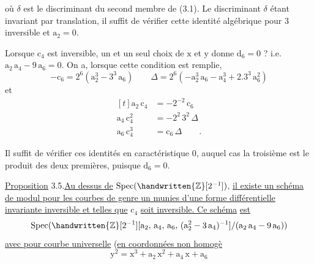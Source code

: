 où $\delta$ est le discriminant du second membre de (3.1). Le discriminant $\delta$ étant invariant par translation, il suffit de vérifier cette identité algébrique pour $3$ inversible et $\mathrm{a}_{2}=0$.

Lorsque $\mathrm{c}_{4}$ est inversible, un et un seul choix de $\mathrm{x}$ et $\mathrm{y}$ donne $\mathrm{d}_{6}=0$ ? i.e. $\mathrm{a}_{2}\,\mathrm{a}_{4}-9\,\mathrm{a}_{6}=0$. On a, lorsque cette condition est remplie,
\[
-\mathrm{c}_{6}=2^{6}(\mathrm{a}_{2}^{3}-3^{3}\,\mathrm{a}_{6})\qquad
\Delta=2^{6}(-\mathrm{a}_{2}^{3}\,\mathrm{a}_{6}-\mathrm{a}_{4}^{3}+2.3^{3}\,\mathrm{a}_{6}^{2})
\tag*{(3.3)}
\]
et
\[
\begin{aligned}[t]
\mathrm{a}_{2}\,\mathrm{c}_{4}&=-2^{-2}\,\mathrm{c}_{6}\\
\mathrm{a}_{4}\,\mathrm{c}_{4}^{2}&=-2^{2}\,3^{2}\,\Delta\\
\mathrm{a}_{6}\,\mathrm{c}_{4}^{3}&=\mathrm{c}_{6}\,\Delta\qquad.
\end{aligned}
\tag*{(3.4)}
\]

Il suffit de vérifier ces identités en caractéristique $0$, auquel cas la troisième est le produit des deux premières, puisque $\mathrm{d}_{6}=0$.

\uline{Proposition} 3.5.\quad \uline{Au dessus de} $\operatorname{Spec}(\handwritten{\mathbb{Z}}[2^{-1}])$, \uline{il existe un schéma de modul}\uline{ pour les courbes de genre un munies d'une forme différentielle invariante inversible et telles que} $\mathrm{c}_{4}$ \uline{soit inversible. Ce schéma} \reversemarginpar{}\normalmarginpar\uline{est}
\[
\operatorname{Spec}(\handwritten{\mathbb{Z}}[2^{-1}][\mathrm{a}_{2},\,\mathrm{a}_{4},\,\mathrm{a}_{6},\,(\mathrm{a}_{2}^{2}-3\,\mathrm{a}_{4})^{-1}]/(\mathrm{a}_{2}\,\mathrm{a}_{4}-9\,\mathrm{a}_{6}))
\]
\uline{avec pour courbe universelle} (\uline{en coordonnées non homogè}
\[
\mathrm{y}^{2}=\mathrm{x}^{3}+\mathrm{a}_{2}\,\mathrm{x}^{2}+\mathrm{a}_{4}\,\mathrm{x}+\mathrm{a}_{6}
\]
\clearpage

